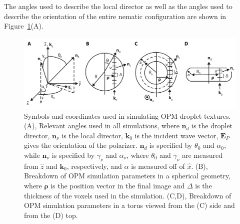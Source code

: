 The angles used to describe the local director as well as the angles used to describe the orientation of the entire nematic configuration are shown in Figure~\ref{f:4-generalcoords}(A).
\begin{figure}
\centering
\includegraphics{figures/C4/Ch4-Figs_JonesGeometry.png}
\caption{Symbols and coordinates used in simulating OPM droplet textures.
(A), Relevant angles used in all simulations, where $\mathbf{n}_d$ is the droplet director, $\mathbf{n}_{\nu}$ is the local director, $\mathbf{k}_0$ is the incident wave vector, $\mathbf{E}_P$ gives the orientation of the polarizer.
$\mathbf{n}_d$ is specified by $\theta_0$ and $\alpha_0$, while $\mathbf{n}_{\nu}$ is specified by $\gamma_{\nu}$ and $\alpha_{\nu}$, where $\theta_0$ and $\gamma_{\nu}$ are measured from $\hat{z}$ and $\mathbf{k}_0$, respectively, and $\alpha$ is measured off of $\hat{x}$.
(B), Breakdown of OPM simulation parameters in a spherical geometry, where $\bm{\rho}$ is the position vector in the final image and $\Delta$ is the thickness of the voxels used in the simulation.
(C,D), Breakdown of OPM simulation parameters in a torus viewed from the (C) side and from the (D) top.}\label{f:4-generalcoords}
\end{figure}

